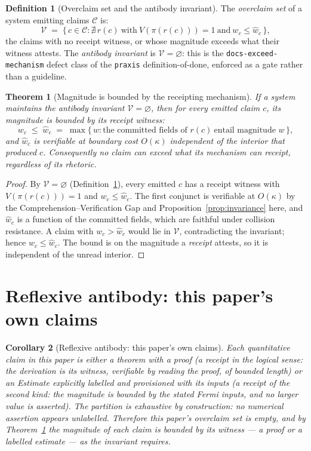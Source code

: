 \documentclass[11pt,oneside]{book}
\theoremstyle{definition}
\newtheorem{definition}{Definition}[chapter]
\theoremstyle{plain}
\newtheorem{theorem}{Theorem}[chapter]
\newtheorem{corollary}[theorem]{Corollary}
\theoremstyle{remark}
\newcommand{\Proj}{\pi}                        %
\newcommand{\CL}{\kappa}                       %
\newcommand{\code}[1]{\texttt{#1}}
\newcommand{\Over}{\mathcal{V}}                %
\begin{document}
\begin{definition}[Overclaim set and the antibody invariant]\label{def:over}
The \emph{overclaim set} of a system emitting claims $\mathcal C$ is:
\[
\Over\;=\;\{\,c\in\mathcal C : \nexists\,r(c)\ \text{with}\ V(\Proj(r(c)))=1\ \text{and}\ w_c\le\widehat w_c\,\},
\]
the claims with no receipt witness, or whose magnitude exceeds what their witness attests. %
The \emph{antibody invariant} is $\Over=\varnothing$: this is the \code{docs-exceed-mechanism} defect class of the \code{praxis} definition-of-done, enforced as a gate rather than a guideline. %
\end{definition}

\begin{theorem}[Magnitude is bounded by the receipting mechanism]\label{thm:magnitude}
If a system maintains the antibody invariant $\Over=\varnothing$, then for every emitted claim $c$, its magnitude is bounded by its receipt witness:
\[
w_c\;\le\;\widehat w_c\;=\;\max\{\,w : \text{the committed fields of } r(c)\ \text{entail magnitude } w\,\},
\]
and $\widehat w_c$ is verifiable at boundary cost $O(\CL)$ independent of the interior that produced $c$. %
Consequently no claim can exceed what its mechanism can receipt, regardless of its rhetoric. %
\end{theorem}

\begin{proof}
By $\Over=\varnothing$ (Definition~\ref{def:over}), every emitted $c$ has a receipt witness with $V(\Proj(r(c)))=1$ and $w_c\le\widehat w_c$. %
The first conjunct is verifiable at $O(\CL)$ by the Comprehension--Verification Gap and Proposition~\ref{prop:invariance} here, and $\widehat w_c$ is a function of the committed fields, which are faithful under collision resistance. %
A claim with $w_c>\widehat w_c$ would lie in $\Over$, contradicting the invariant; hence $w_c\le\widehat w_c$. %
The bound is on the magnitude a \emph{receipt} attests, so it is independent of the unread interior. %
\end{proof}

\section{Reflexive antibody: this paper's own claims}

\begin{corollary}[Reflexive antibody: this paper's own claims]\label{cor:reflexive}
Each quantitative claim in this paper is either a theorem with a proof (a receipt in the logical sense: the derivation is its witness, verifiable by reading the proof, of bounded length) or an \emph{Estimate} explicitly labelled and provisioned with its inputs (a receipt of the second kind: the magnitude is bounded by the stated Fermi inputs, and no larger value is asserted). %
The partition is exhaustive by construction: no numerical assertion appears unlabelled. %
Therefore this paper's overclaim set is empty, and by Theorem~\ref{thm:magnitude} the magnitude of each claim is bounded by its witness --- a proof or a labelled estimate --- as the invariant requires. %
\end{corollary}
\end{document}
